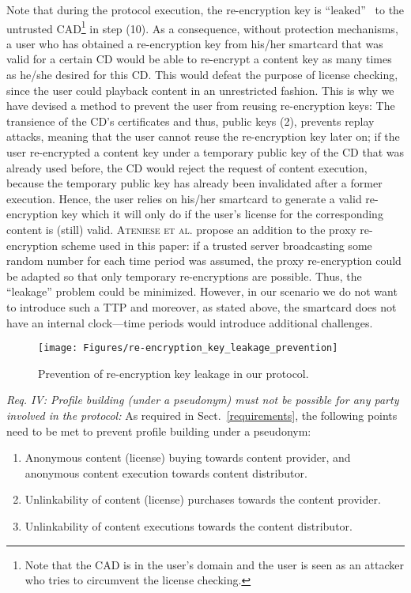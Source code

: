 \documentclass{llncs}
\newcommand{\refSec}[1]{Sect.~\ref{#1}}
\begin{document}
Note that during the protocol execution, the re-encryption key is ``leaked''~\cite{re-encryption_key_leakage} to the untrusted CAD\footnote{Note that the CAD is in the user's domain and the user is seen as an attacker who tries to circumvent the license checking.} in step (10). As a consequence, without protection mechanisms, a user who has obtained a re-encryption key from his/her smartcard that was valid for a certain CD would be able to re-encrypt a content key as many times as he/she desired for this CD. This would defeat the purpose of license checking, since the user could playback content in an unrestricted fashion. This is why we have devised a method to prevent the user from reusing re-encryption keys: The transience of the CD's certificates and thus, public keys (2), prevents replay attacks, meaning that the user cannot reuse the re-encryption key later on; if the user re-encrypted a content key under a temporary public key of the CD that was already used before, the CD would reject the request of content execution, because the temporary public key has already been invalidated after a former execution. Hence, the user relies on his/her smartcard to generate a valid re-encryption key which it will only do if the user's license for the corresponding content is (still) valid. \textsc{Ateniese et al.} \cite{ateniese_improved} propose an addition to the proxy re-encryption scheme used in this paper: if a trusted server broadcasting some random number for each time period was assumed, the proxy re-encryption could be adapted so that only temporary re-encryptions are possible. Thus, the ``leakage'' problem could be minimized. However, in our scenario we do not want to introduce such a TTP and moreover, as stated above, the smartcard does not have an internal clock---time periods would introduce additional challenges. 

\begin{figure}[ht]
	\centering	\texttt{[image: Figures/re-encryption\_key\_leakage\_prevention]}
	\caption{Prevention of re-encryption key leakage in our protocol.}
	\label{fig:re-encryption_key_leakage_prevention}
\end{figure}

\emph{Req. IV: Profile building (under a pseudonym) must not be possible for any party involved in the protocol: } As required in \refSec{requirements}, the following points need to be met to prevent profile building under a pseudonym: 

\begin{enumerate}
\item Anonymous content (license) buying towards content provider, and anonymous content execution towards content distributor.
\item Unlinkability of content (license) purchases towards the content provider.
\item Unlinkability of content executions towards the content distributor.
\end{enumerate}
\end{document}
